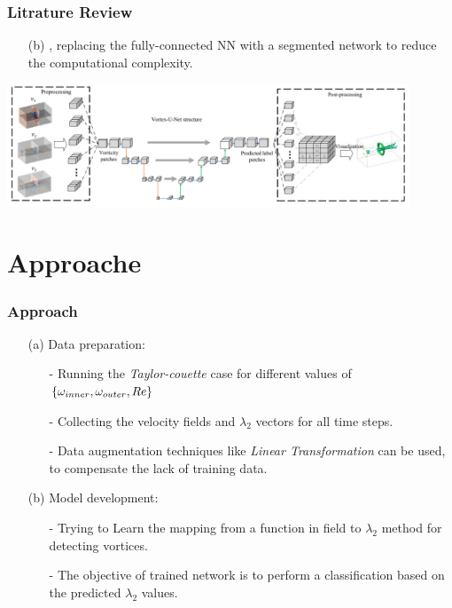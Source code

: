 \documentclass[aspectratio=169]{beamer}
\begin{document}
\begin{frame}
  \frametitle{Litrature Review}
  \begin{itemize}
    \item[(b)] \cite{DENG2022108229}, replacing the fully-connected NN with a segmented network to reduce the computational complexity.
  \end{itemize}
  \begin{center}
    \includegraphics[width=0.9\textwidth]{U-net.png}
  \end{center}
\end{frame}

\section{Approache}
\begin{frame}
  \frametitle{Approach}
  \begin{itemize}
    \item[(a)] Data preparation:
    \begin{itemize}
      \item[-] Running the  \textit{Taylor-couette} case for different values of  $\{\omega_{inner}, \omega_{outer}, \mathnormal{Re}\}$
      \item[-] Collecting the velocity fields and $\lambda_2$ vectors for all time steps.
      \item[-] Data augmentation techniques \cite{Berenjkoub2020} like \textit{Linear Transformation} can be used, to compensate the lack of training data.
    \end{itemize}
    \item [(b)] Model development:
      \begin{itemize}
        \item[-] Trying to Learn the mapping from a function in field to $\lambda_{2}$ method for detecting vortices.
        \item[-] The objective of trained network is to perform a classification based on the predicted $\lambda_{2}$ values.
      \end{itemize}
  \end{itemize}
\end{frame}
\end{document}
